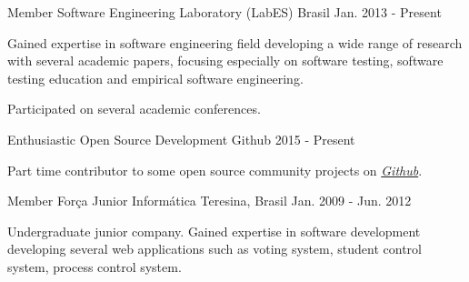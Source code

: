 

\begin{cventries}

  \cventry
    {Member} %
    {Software Engineering Laboratory (LabES)} %
    {Brasil} %
    {Jan. 2013 - Present} %
    {
      \begin{cvitems} %
        \item {Gained expertise in software engineering field developing a wide range of research with several academic papers, focusing especially on software testing, software testing education and empirical software engineering.}
        \item {Participated on several academic conferences.}
      \end{cvitems}
    }

  \cventry
    {Enthusiastic} %
    {Open Source Development} %
    {Github} %
    {2015 - Present} %
    {
      \begin{cvitems} %
        \item {Part time contributor to some open source community projects on \href{https://github.com/stevaoaa}{\textit{Github}}.}
      \end{cvitems}
    }



  \cventry
    {Member} %
    {Força Junior Informática} %
    {Teresina, Brasil} %
    {Jan. 2009 - Jun. 2012} %
    {
      \begin{cvitems} %
        \item {Undergraduate junior company. Gained expertise in software development developing several web applications such as voting system, student control system, process control system.}
      \end{cvitems}
    }



\end{cventries}
